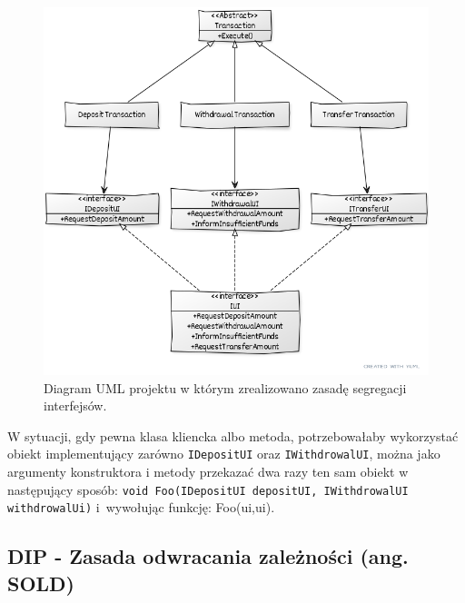 \begin{figure}[hbt!]
	\centering
	\includegraphics[width=0.8\linewidth]{images/SolidIspUml}
	\caption{Diagram UML projektu w którym zrealizowano zasadę segregacji interfejsów.}
	\label{lab1/fig/SolidIspUml}
\end{figure}
%
%
%
%
%
%

W sytuacji, gdy pewna klasa kliencka albo metoda, potrzebowałaby wykorzystać obiekt implementujący zarówno \texttt{IDepositUI} oraz \texttt{IWithdrowalUI}, można jako argumenty konstruktora i metody przekazać dwa razy ten sam obiekt w następujący sposób: \texttt{void Foo(IDepositUI depositUI, IWithdrowalUI withdrowalUi)} i~wywołując funkcję: Foo(ui,ui).




\subsection{DIP - Zasada odwracania zależności (ang. SOLD)}

